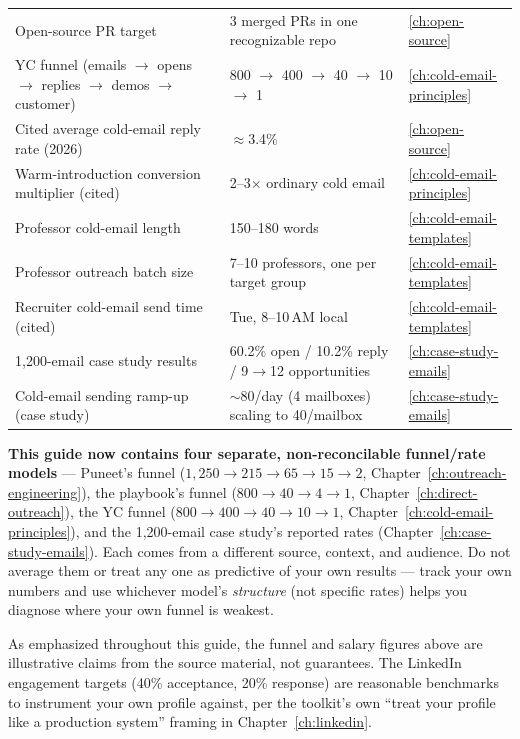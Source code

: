 \begin{longtable}{p{} p{} p{}}
Open-source PR target & 3 merged PRs in one recognizable repo & \ref{ch:open-source} \\
YC funnel (emails $\to$ opens $\to$ replies $\to$ demos $\to$ customer) & 800 $\to$ 400 $\to$ 40 $\to$ 10 $\to$ 1
& \ref{ch:cold-email-principles} \\
Cited average cold-email reply rate (2026) & $\approx$3.4\% & \ref{ch:open-source} \\
Warm-introduction conversion multiplier (cited) & 2--3$\times$ ordinary cold email & \ref{ch:cold-email-principles}
\\
Professor cold-email length & 150--180 words & \ref{ch:cold-email-templates} \\
Professor outreach batch size & 7--10 professors, one per target group & \ref{ch:cold-email-templates} \\
Recruiter cold-email send time (cited) & Tue, 8--10\,AM local & \ref{ch:cold-email-templates} \\
1,200-email case study results & 60.2\% open / 10.2\% reply / 9$\to$12 opportunities & \ref{ch:case-study-emails}
\\
Cold-email sending ramp-up (case study) & $\sim$80/day (4 mailboxes) scaling to 40/mailbox & \ref{ch:case-study-emails}
\\
\bottomrule
\end{longtable}

\begin{caution}
\textbf{This guide now contains four separate, non-reconcilable funnel/rate models} — Puneet's funnel
($1{,}250\to215\to65\to15\to2$, Chapter~\ref{ch:outreach-engineering}), the playbook's funnel
($800\to40\to4\to1$, Chapter~\ref{ch:direct-outreach}), the YC funnel ($800\to400\to40\to10\to1$,
Chapter~\ref{ch:cold-email-principles}), and the 1,200-email case study's reported rates
(Chapter~\ref{ch:case-study-emails}). Each comes from a different source, context, and audience. Do not average
them or treat any one as predictive of your own results — track your own numbers and use whichever model's
\emph{structure} (not specific rates) helps you diagnose where your own funnel is weakest.
\end{caution}

\begin{caution}
As emphasized throughout this guide, the funnel and salary figures above are illustrative claims from the source
material, not guarantees. The LinkedIn engagement targets (40\% acceptance, 20\% response) are reasonable
benchmarks to instrument your own profile against, per the toolkit's own ``treat your profile like a production
system'' framing in Chapter~\ref{ch:linkedin}.
\end{caution}

